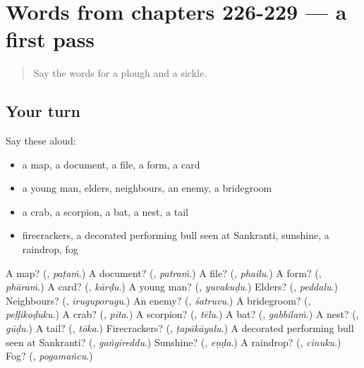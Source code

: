 \section[(dialogue)]{Words from chapters 226-229 — a first pass}

\label{lesson:TE-R234-first-pass-words-from-chapters-226-229}



\begin{quote}
Say the words for a plough and a sickle.
\end{quote}

\subsection*{Your turn}
Say these aloud:

\begin{itemize}
\raggedright
  \item a map, a document, a file, a form, a card
  \item a young man, elders, neighbours, an enemy, a bridegroom
  \item a crab, a scorpion, a bat, a nest, a tail
  \item firecrackers, a decorated performing bull seen at Sankranti, sunshine, a raindrop, fog
\end{itemize}

\begin{tcolorbox}[breakable,colback=teal!4,colframe=teal!35!black,title={Before you move on}]
A map? (\textbf{}, \emph{paṭaṁ}.) A document? (\textbf{}, \emph{patraṁ}.) A file? (\textbf{}, \emph{phailu}.) A form? (\textbf{}, \emph{phāraṁ}.) A card? (\textbf{}, \emph{kārḍu}.) A young man? (\textbf{}, \emph{yuvakuḍu}.) Elders? (\textbf{}, \emph{peddalu}.) Neighbours? (\textbf{}, \emph{iruguporugu}.) An enemy? (\textbf{}, \emph{śatruvu}.) A bridegroom? (\textbf{}, \emph{peḷḷikoḍuku}.) A crab? (\textbf{}, \emph{pīta}.) A scorpion? (\textbf{}, \emph{tēlu}.) A bat? (\textbf{}, \emph{gabbilaṁ}.) A nest? (\textbf{}, \emph{gūḍu}.) A tail? (\textbf{}, \emph{tōka}.) Firecrackers? (\textbf{}, \emph{ṭapākāyalu}.) A decorated performing bull seen at Sankranti? (\textbf{}, \emph{gaṅgireddu}.) Sunshine? (\textbf{}, \emph{eṇḍa}.) A raindrop? (\textbf{}, \emph{cinuku}.) Fog? (\textbf{}, \emph{pogamañcu}.)
\end{tcolorbox}
